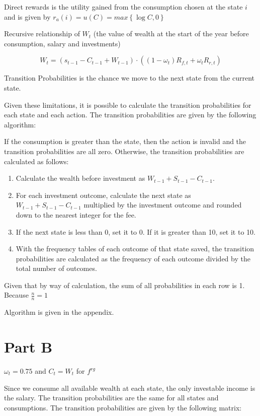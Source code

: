 \documentclass[12pt]{article}
\begin{document}
Direct rewards is the utility gained from the consumption chosen at the state
$i$ and is given by $r_a(i)=u(C) = max\left\{ \log C, 0\right\}$

Recursive relationship of $W_t$ (the value of wealth at the start of the year
before consumption, salary and investments)

$$
	W_t=
	\left(s_{t-1} -C_{t-1} + W_{t-1}\right)
	\cdot\left( \left(1-\omega_t\right) R_{f,t} + \omega_t R_{r,t}\right)
$$

Transition Probabilities is the chance we move to the next state from the
current state.

Given these limitations, it is possible to calculate the transition
probabilities for each state and each action. The transition probabilities are
given by the following algorithm:

If the consumption is greater than the state, then the action is invalid and
the transition probabilities are all zero. Otherwise, the transition
probabilities are calculated as follows:

\begin{enumerate}
	\item Calculate the wealth before investment as $W_{t-1} + S_{t-1} - C_{t-1}$.
	\item For each investment outcome, calculate the next state as $W_{t-1} + S_{t-1} -
		      C_{t-1}$ multiplied by the investment outcome and rounded down to the nearest
	      integer for the fee.
	\item If the next state is less than 0, set it to 0. If it is greater than 10, set it
	      to 10.
	\item With the frequency tables of each outcome of that state saved, the transition
	      probabilities are calculated as the frequency of each outcome divided by the
	      total number of outcomes.
\end{enumerate}

Given that by way of calculation, the sum of all probabilities in each row is
1. Because $\frac{n}{n} = 1$

Algorithm is given in the appendix.

\section{Part B}
$\omega_t = 0.75$  and $C_t = W_t$ for $f^{rg}$

Since we consume all available wealth at each state, the only investable income
is the salary. The transition probabilities are the same for all states and
consumptions. The transition probabilities are given by the following matrix:
\end{document}
